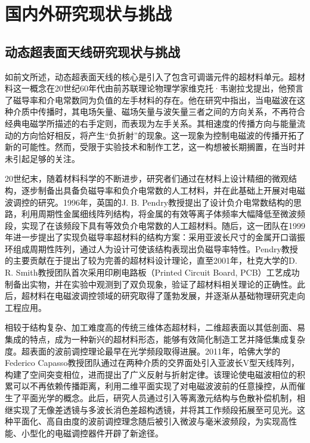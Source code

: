 \section{国内外研究现状与挑战}\label{sec:current_research_and_challenge}

\subsection{动态超表面天线研究现状与挑战}

如前文所述，动态超表面天线的核心是引入了包含可调谐元件的超材料单元。超材料这一概念在20世纪60年代由前苏联理论物理学家维克托·韦谢拉戈提出，他预言了磁导率和介电常数同为负值的左手材料的存在。他在研究中指出，当电磁波在这种介质中传播时，其电场矢量、磁场矢量与波矢量三者之间的方向关系，不再符合经典电磁学所描述的右手定则，而表现为左手关系\cite{veselago1968electrodynamics}。其相速度的传播方向与能量流动的方向恰好相反，将产生“负折射”的现象。这一现象为控制电磁波的传播开拓了新的可能性\cite{engheta2006metamaterials}。然而，受限于实验技术和制作工艺，这一构想被长期搁置，在当时并未引起足够的关注。

20世纪末，随着材料科学的不断进步，研究者们通过在材料上设计精细的微观结构，逐步制备出具备负磁导率和负介电常数的人工材料，并在此基础上开展对电磁波调控的研究。1996年，英国的J. B. Pendry教授提出了设计负介电常数结构的思路，利用周期性金属细线阵列结构，将金属的有效等离子体频率大幅降低至微波频段，实现了在该频段下具有等效负介电常数的人工超材料\cite{pendry1996extremely,pendry1998low}。随后，这一团队在1999年进一步提出了实现负磁导率超材料的结构方案：采用亚波长尺寸的金属开口谐振环组成周期性阵列，通过人为设计可使该结构表现出负磁导率特性\cite{pendry1999magnetism}。Pendry教授的主要贡献在于提出了较为完善的超材料设计理论，直至2001年，杜克大学的D. R. Smith教授团队首次采用印刷电路板（Printed Circuit Board, PCB）工艺成功制备出实物，并在实验中观测到了双负现象，验证了超材料相关理论的正确性\cite{smith2000composite,shelby2001experimental}。此后，超材料在电磁波调控领域的研究取得了蓬勃发展，并逐渐从基础物理研究走向工程应用。

相较于结构复杂、加工难度高的传统三维体态超材料，二维超表面以其低剖面、易集成的特点，成为一种新兴的超材料形态，能够有效简化制造工艺并降低集成复杂度\cite{cui2010metamaterials,chen2016review,li2024electromagnetic}。超表面的波前调控理论最早在光学频段取得进展。2011年，哈佛大学的Federico Capasso教授团队通过在两种介质的交界面处引入亚波长V型天线阵列，构建了空间突变相位，进而提出了广义反射与折射定律\cite{yu2011light}。该理论使电磁波相位的积累可以不再依赖传播距离，利用二维平面实现了对电磁波波前的任意操控，从而催生了平面光学的概念\cite{yu2014flat}。此后，研究人员通过引入等离激元结构与色散补偿机制，相继实现了无像差透镜\cite{aieta2012aberration}与多波长消色差超构透镜\cite{aieta2015multiwavelength}，并将其工作频段拓展至可见光\cite{khorasaninejad2016metalenses}。这种平面化、高自由度的波前调控理念随后被引入微波与毫米波频段，为实现高性能、小型化的电磁调控器件开辟了新途径\cite{hunt2013metamaterial,wang2020metantenna,yang2025advanced}。

